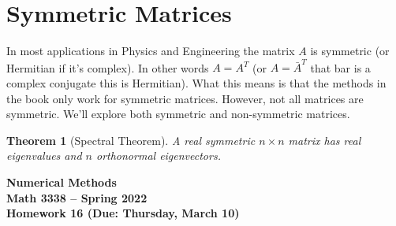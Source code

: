 \documentclass[11pt,letterpaper]{article}
\newcommand{\semester}{Spring 2022}
\newcommand{\due}{Thursday, March 10}
\newtheorem{theorem}{Theorem}
\begin{document}
\section{Symmetric Matrices}

In most applications in Physics and Engineering the matrix $A$ is symmetric (or Hermitian if it's complex). In other words $A=A^T$ (or $A=\bar{A}^T$ that bar is a complex conjugate this is Hermitian). What this means is that the methods in the book only work for symmetric matrices. However, not all matrices are symmetric. We'll explore both symmetric and non-symmetric matrices.  %


\begin{theorem}[Spectral Theorem]
A real symmetric $n\times n$ matrix has real eigenvalues and $n$ orthonormal eigenvectors.
\end{theorem}



\newpage

\begin{center}
{\huge{\bf  Numerical Methods}} \\[1.5ex]
{\bf Math 3338 -- \semester}\\[1.5ex]
{\Large{\bf Homework 16 (Due: \due)}}\\
\end{center}
\vspace{2mm}
\end{document}
